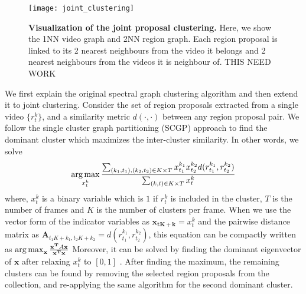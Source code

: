 \begin{figure}[ht]
  \texttt{[image: joint\_clustering]}

  \caption{\textbf{Visualization of the joint proposal clustering.} Here, we show the 1NN video graph and 2NN region graph. Each region proposal is linked to its 2 nearest neighbours from the video it belongs and 2 nearest neighbours from the videos it is neighbour of. THIS NEED WORK}
  \label{hierProposal}
\end{figure}

We first explain the original spectral graph clustering algorithm and then extend it to joint clustering. Consider the set of region proposals extracted from a single video $\{r^k_t\}$, and a similarity metric $d(\cdot,\cdot)$ between any region proposal pair. We follow the single cluster graph partitioning (SCGP)\cite{scgp} approach to find the dominant cluster which maximizes the inter-cluster similarity. In other words, we solve
\begin{equation}
  \operatorname*{arg\,max}_{x^k_t} \frac{\sum_{(k_1,t_1),(k_2,t_2) \in K \times T} x^{k_1}_{t_1} x^{k_2}_{t_2} d(r^{k_1}_{t_1},r^{k_2}_{t_2})}{\sum_{(k,t) \in K \times T} x^{k}_t}
\end{equation}
where, $x^{k}_t$ is a binary variable which is $1$ if $r^{k}_t$ is included in the cluster, $T$ is the number of frames and $K$ is the number of clusters per frame. When we use the vector form of the indicator variables as $\mathbf{x_{tK+k}}=x^{k}_{t}$ and the pairwise distance matrix as $\mathbf{A}_{t_1K+k_1,t_2K+k_2}=d(r^{k_1}_{t_1},r^{k_2}_{t_2})$, this equation can be compactly written as
$\operatorname*{arg\,max}_{\mathbf{x}} \frac{\mathbf{x^T}A\mathbf{x}}{\mathbf{x^T}\mathbf{x}}$
Moreover, it can be solved by finding the dominant eigenvector of $\mathbf{x}$ after relaxing $x^{k}_t$ to $[0,1]$ \cite{scgp,scgp_eigen}. After finding the maximum, the remaining clusters can be found by removing the selected region proposals from the collection, and re-applying the same algorithm for the second dominant cluster.

